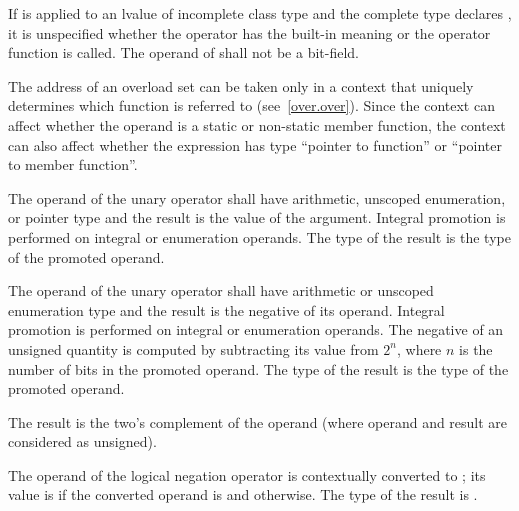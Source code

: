 \pnum
If \tcode{\&} is applied to an lvalue of incomplete class type and the
complete type declares , it is unspecified whether
the operator has the built-in meaning or the operator function is
called. The operand of \tcode{\&} shall not be a bit-field.

\pnum
{}%
\begin{note}
The address of an overload set can be taken
only in a context that uniquely determines
which function is referred to (see~\ref{over.over}).
Since the context can affect whether the operand is a static or
non-static member function, the context can also affect whether the
expression has type ``pointer to function'' or ``pointer to member
function''.
\end{note}

\pnum
{}%
The operand of the unary \tcode{+} operator shall have arithmetic, unscoped
enumeration, or pointer type and the result is the value of the
argument. Integral promotion is performed on integral or enumeration
operands. The type of the result is the type of the promoted operand.

\pnum
{}%
The operand of the unary \tcode{-} operator shall have arithmetic or unscoped
enumeration type and the result is the negative of its operand. Integral
promotion is performed on integral or enumeration operands. The negative
of an unsigned quantity is computed by subtracting its value from $2^n$,
where $n$ is the number of bits in the promoted operand. The type of the
result is the type of the promoted operand.
\begin{note}
The result is the two's complement of the operand
(where operand and result are considered as unsigned).
\end{note}

\pnum
{}%
The operand of the logical negation operator \tcode{!} is contextually
converted to ;
its value is 
if the converted operand is  and  otherwise.
The type of the result is .

